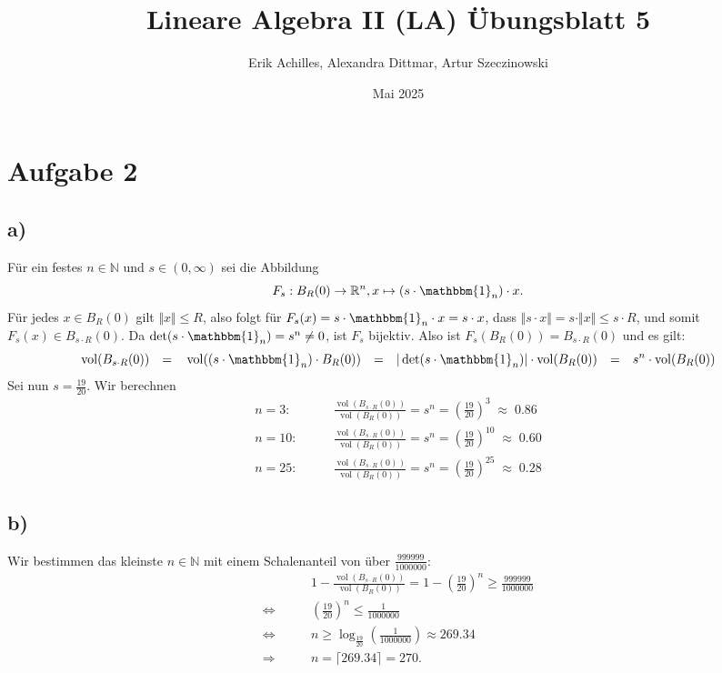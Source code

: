 \documentclass{article}
\title{Lineare Algebra II (LA) Übungsblatt 5}
\author{Erik Achilles, Alexandra Dittmar, Artur Szeczinowski}
\date{Mai 2025}
\newcommand{\NN}{\mathbb{N}}
\newcommand{\RR}{\mathbb{R}}
\newcommand{\imp}{\mathbb{\Rightarrow}}
\newcommand{\equ}{\mathbb{\Leftrightarrow}}
\newcommand{\eq}{\mathbb{\quad = \quad}}
\DeclareMathOperator{\vol}{vol}
\begin{document}
\section*{Aufgabe 2}

\subsection*{a)}

Für ein festes $n \in \NN$ und $s \in (0, \infty)$
sei die Abbildung
$$
F_s: B_{R}(0) \to \RR^n , x \mapsto (s \cdot \mathbbm{1}_n) \cdot x.
$$
Für jedes $x \in B_R(0)$ gilt $\Vert x \Vert \leq R$,
also folgt für $F_s(x) = s \cdot \mathbbm{1}_n \cdot x = s \cdot x$,
dass $\Vert s \cdot x \Vert = s \cdot \Vert x \Vert \leq s \cdot R$,
und somit $F_s(x) \in B_{s\cdot R}(0)$.
Da $\det(s \cdot \mathbbm{1}_n) = s^n \neq 0$,
ist $F_s$ bijektiv.
Also ist $F_s(B_{R}(0)) = B_{s \cdot R}(0)$ und es gilt:
$$
\vol(B_{s \cdot R}(0)) \eq
\vol((s \cdot \mathbbm{1}_n) \cdot B_{R}(0)) \eq
|\det(s \cdot \mathbbm{1}_n)| \cdot \vol(B_R(0)) \eq 
s^n \cdot \vol(B_R(0))
$$
Sei nun $s = \frac{19}{20}$.
Wir berechnen
\begin{align*}
  n=3: \qquad & \frac{\vol(B_{s\cdot R}(0))}{\vol(B_R(0))}
  = s^n = \left(\frac{19}{20}\right)^3 \;\approx\; 0.86 \\
  n=10: \qquad & \frac{\vol(B_{s\cdot R}(0))}{\vol(B_R(0))}
  = s^n = \left(\frac{19}{20}\right)^{10} \;\approx\; 0.60 \\
  n=25: \qquad & \frac{\vol(B_{s\cdot R}(0))}{\vol(B_R(0))}
  = s^n = \left(\frac{19}{20}\right)^{25} \;\approx\; 0.28
\end{align*}

\subsection*{b)}
Wir bestimmen das kleinste $n \in \NN$
mit einem Schalenanteil von über $\frac{999999}{1000000}$:
\begin{align*}
  &1 -\frac{\vol(B_{s\cdot R}(0))}{\vol(B_R(0))} = 1- \left(\frac{19}{20}\right)^n
  \geq \frac{999999}{1000000} \\
  \equ\qquad &\left(\frac{19}{20}\right)^n \leq \frac{1}{1000000} \\
  \equ\qquad &n \geq \log_{\frac{19}{20}}\left(\frac{1}{1000000}\right) \approx 269.34 \\
  \imp \qquad & n = \lceil 269.34 \rceil = 270.
\end{align*}
\end{document}
